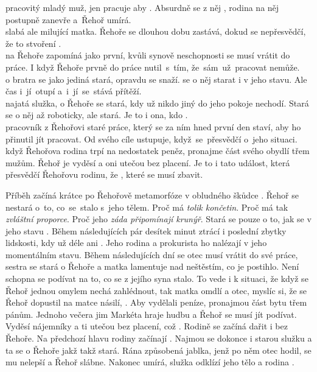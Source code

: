 \documentclass[FGBook.tex]{subfiles}
\begin{document}
\noindent 
{} pracovitý mladý muž,
jen pracuje aby .
Absurdně se z něj ,
rodina na něj postupně zanevře a~Řehoř umírá. \\
 slabá ale milující matka.
Řehoře se dlouhou dobu zastává, dokud se nepřesvědčí,
že to stvoření . \\
 na Řehoře zapomíná jako první,
kvůli synově neschopnosti se musí vrátit do práce.
I když Řehoře prvně do práce nutil~s~tím, že~sám~už~pracovat nemůže. \\
 o bratra se jako jediná stará, opravdu se snaží.
 se o něj starat i v jeho stavu.
Ale čas i~jí~otupí a~i~jí~se~stává přítěží. \\
 najatá služka, o Řehoře se stará,
kdy už nikdo jiný do jeho pokoje nechodí.
Stará se o něj až roboticky, ale stará.
Je to i ona, kdo . \\
 pracovník z Řehořovi staré práce,
který se za ním hned první den staví, aby ho přinutil jít pracovat.
Od svého cíle ustupuje, když~se~přesvědčí o~jeho situaci. \\
 když Řehořova rodina trpí na nedostatek peněz,
pronajme část svého obydlí třem mužům.
Řehoř je vyděsí a oni utečou bez placení.
Je to i tato událost, která přesvědčí Řehořovu rodinu,
že , které se musí zbavit.

\noindent Příběh začíná krátce po Řehořově metamorfóze v obludného škůdce
.
Řehoř se nestará o~to, co~se~stalo s~jeho tělem.
Proč má \textit{tolik končetin}.
Proč má tak \textit{zvláštní proporce}.
Proč jeho \textit{záda připomínají krunýř}.
Stará se pouze o to, jak se v jeho stavu .
Během následujících pár desítek minut ztrácí i poslední zbytky lidskosti,
kdy už déle ani .
Jeho rodina a prokurista ho nalézají v jeho momentálním stavu.
Během následujících dní se otec musí vrátit do své práce,
sestra se stará o Řehoře a matka lamentuje nad neštěstím, co je postihlo.
Není schopna se podívat na to, co se z jejího syna stalo.
To vede i k situaci, že když se Řehoř jednou omylem nechá zahlédnout,
tak matka omdlí a otec, myslíc si, že se Řehoř dopustil na matce násilí,
.
Aby vydělali peníze, pronajmou část bytu třem pánům.
Jednoho večera jim Markéta hraje hudbu a Řehoř se musí jít podívat.
Vyděsí nájemníky a ti utečou bez placení, což .
Rodině se začíná dařit i bez Řehoře.
Na předchozí hlavu rodiny začínají .
Najmou se dokonce i starou služku a ta se o Řehoře jakž takž stará.
Rána způsobená jablka, jenž po něm otec hodil, se mu nelepší a Řehoř slábne.
Nakonec umírá, služka odklízí jeho tělo a rodina .
\end{document}
